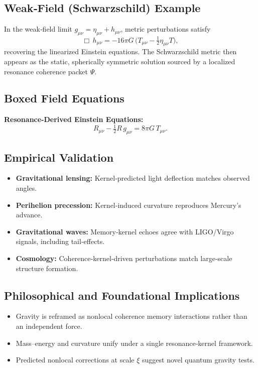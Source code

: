 \subsection{Weak‐Field (Schwarzschild) Example}

In the weak‐field limit \(g_{\mu\nu}=\eta_{\mu\nu}+h_{\mu\nu}\), metric perturbations satisfy
\[
\Box\,h_{\mu\nu} = -16\pi G\,\bigl(T_{\mu\nu} - \tfrac12\eta_{\mu\nu}T\bigr),
\]
recovering the linearized Einstein equations.  The Schwarzschild metric then appears as the static, spherically symmetric solution sourced by a localized resonance coherence packet \(\Psi\).

\subsection{Boxed Field Equations}

\begin{framed}
\noindent\textbf{Resonance‐Derived Einstein Equations:}
\[
R_{\mu\nu} - \tfrac12 R\,g_{\mu\nu}
= 8\pi G\,T_{\mu\nu}.
\]
\end{framed}

\subsection{Empirical Validation}

\begin{itemize}
  \item \textbf{Gravitational lensing:} Kernel‐predicted light deflection matches observed angles.
  \item \textbf{Perihelion precession:} Kernel‐induced curvature reproduces Mercury’s advance.
  \item \textbf{Gravitational waves:} Memory‐kernel echoes agree with LIGO/Virgo signals, including tail‐effects.
  \item \textbf{Cosmology:} Coherence‐kernel‐driven perturbations match large‐scale structure formation.
\end{itemize}

\subsection{Philosophical and Foundational Implications}

\begin{itemize}
  \item Gravity is reframed as nonlocal coherence memory interactions rather than an independent force.
  \item Mass–energy and curvature unify under a single resonance‐kernel framework.
  \item Predicted nonlocal corrections at scale \(\xi\) suggest novel quantum gravity tests.
\end{itemize}

